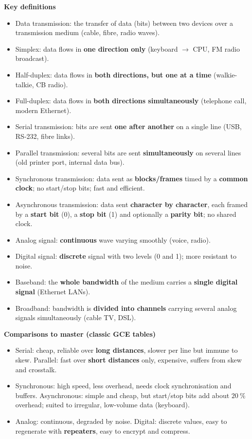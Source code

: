 \documentclass[11pt]{article}
\newcommand{\cle}[1]{{\popxbold\color{popdark}#1}}
\begin{document}
\begin{bilan}
\textbf{Key definitions}
\begin{itemize}
\item \cle{Data transmission}: the transfer of data (bits) between two devices over a \cle{transmission medium} (cable, fibre, radio waves).
\item \cle{Simplex}: data flows in \textbf{one direction only} (keyboard $\to$ CPU, FM radio broadcast).
\item \cle{Half-duplex}: data flows in \textbf{both directions, but one at a time} (walkie-talkie, CB radio).
\item \cle{Full-duplex}: data flows in \textbf{both directions simultaneously} (telephone call, modern Ethernet).
\item \cle{Serial transmission}: bits are sent \textbf{one after another} on a single line (USB, RS-232, fibre links).
\item \cle{Parallel transmission}: several bits are sent \textbf{simultaneously} on several lines (old printer port, internal data bus).
\item \cle{Synchronous transmission}: data sent as \textbf{blocks/frames} timed by a \textbf{common clock}; no start/stop bits; fast and efficient.
\item \cle{Asynchronous transmission}: data sent \textbf{character by character}, each framed by a \textbf{start bit} (0), a \textbf{stop bit} (1) and optionally a \textbf{parity bit}; no shared clock.
\item \cle{Analog signal}: \textbf{continuous} wave varying smoothly (voice, radio).
\item \cle{Digital signal}: \textbf{discrete} signal with two levels (0 and 1); more resistant to noise.
\item \cle{Baseband}: the \textbf{whole bandwidth} of the medium carries a \textbf{single digital signal} (Ethernet LANs).
\item \cle{Broadband}: bandwidth is \textbf{divided into channels} carrying several analog signals simultaneously (cable TV, DSL).
\end{itemize}

\textbf{Comparisons to master (classic GCE tables)}
\begin{itemize}
\item Serial: cheap, reliable over \textbf{long distances}, slower per line but immune to \cle{skew}. Parallel: fast over \textbf{short distances} only, expensive, suffers from skew and crosstalk.
\item Synchronous: high speed, less overhead, needs clock synchronisation and buffers. Asynchronous: simple and cheap, but start/stop bits add about $20\ \%$ overhead; suited to irregular, low-volume data (keyboard).
\item Analog: continuous, degraded by noise. Digital: discrete values, easy to regenerate with \textbf{repeaters}, easy to encrypt and compress.
\end{itemize}


\end{bilan}
\end{document}
